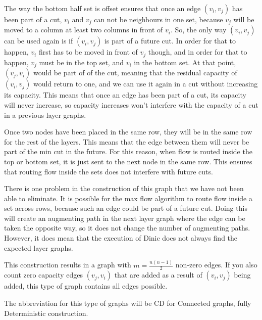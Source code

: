 The way the bottom half set is offset ensures that once an edge $(v_i, v_j)$ has been part of a cut, $v_i$ and $v_j$ can not be neighbours in one set, because $v_j$ will be moved to a column at least two columns in front of $v_i$.
So, the only way $(v_i, v_j)$ can be used again is if $(v_i, v_j)$ is part of a future cut. 
In order for that to happen, $v_i$ first has to be moved in front of $v_j$ though, and in order for that to happen, $v_j$ must be in the top set, and $v_i$ in the bottom set.
At that point, $(v_j, v_i)$ would be part of of the cut, meaning that the residual capacity of $(v_i, v_j)$ would return to one, and we can use it again in a cut without increasing its capacity.
This means that once an edge has been part of a cut, its capacity will never increase, so capacity increases won't interfere with the capacity of a cut in a previous layer graphs.

Once two nodes have been placed in the same row, they will be in the same row for the rest of the layers. This means that the edge between them will never be part of the min cut in the future.
For this reason, when flow is routed inside the top or bottom set, it is just sent to the next node in the same row. This ensures that routing flow inside the sets does not interfere with future cuts.

There is one problem in the construction of this graph that we have not been able to eliminate. It is possible for the max flow algorithm to route flow inside a set across rows, because such an edge could be part of a future cut.
Doing this will create an augmenting path in the next layer graph where the edge can be taken the opposite way, so it does not change the number of augmenting paths. However, it does mean that the execution of Dinic does not always find the expected layer graphs.

This construction results in a graph with $m=\frac{n(n-1)}{2}$ non-zero edges. If you also count zero capacity edges $(v_j, v_i)$ that are added as a result of $(v_i, v_j)$ being added, this type of graph contains all edges possible.

The abbreviation for this type of graphs will be CD for Connected graphs, fully Deterministic construction.

